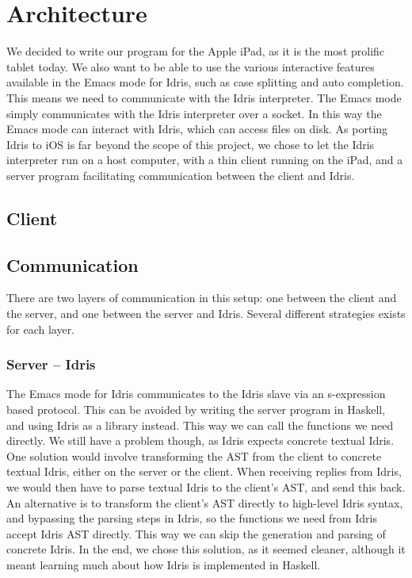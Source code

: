 \section{Architecture}
\label{sec:Architecture}

We decided to write our program for the Apple iPad, as it is the most prolific
tablet today. We also want to be able to use the various interactive features
available in the Emacs mode for Idris, such as case
splitting and auto completion. This means we need to communicate with the Idris
interpreter. The Emacs mode simply communicates with the Idris interpreter over
a socket. In this way the Emacs mode can interact with Idris, which can access
files on disk. As porting Idris to iOS is far beyond the scope of this project,
we chose to let the Idris interpreter run on a host computer, with a thin 
client running on the iPad, and a server program facilitating communication 
between the client and Idris.

\subsection{Client}

\subsection{Communication}
There are two layers of communication in this setup: one between the client and
the server, and one between the server and Idris. Several different strategies
exists for each layer. 

\subsubsection{Server -- Idris}
The Emacs mode for Idris communicates to the Idris slave via an s-expression
based protocol. This can be avoided by writing the server program in
Haskell, and using Idris as a library instead. This way we can call the
functions we need directly. We still have a problem though, as Idris expects
concrete textual Idris. One solution would involve transforming the AST from 
the client to concrete textual Idris, either on the server or the client. When
receiving replies from Idris, we would then have to parse textual Idris to the
client's AST\@, and send this back. An alternative is to transform the 
client's AST directly to high-level Idris syntax, and bypassing the parsing
steps in Idris, so the functions we need from Idris accept Idris AST directly.
This way we can skip the generation and parsing of concrete Idris. In the end,
we chose this solution, as it seemed cleaner, although it meant learning much
about how Idris is implemented in Haskell.

